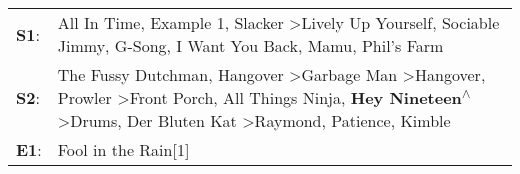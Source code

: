 \begin{supertabular}{p{0.03\textwidth}p{0.92\textwidth}}
 \textbf{S1}:  &                                                                                                                                                                                                                           All In Time\textsuperscript{}, \enspace Example 1\textsuperscript{}, \enspace Slacker\textsuperscript{} \textgreater \enspace Lively Up Yourself\textsuperscript{}, \enspace Sociable Jimmy\textsuperscript{}, \enspace G-Song\textsuperscript{}, \enspace I Want You Back\textsuperscript{}, \enspace Mamu\textsuperscript{}, \enspace Phil's Farm\textsuperscript{}  \enspace  \\
 \textbf{S2}:  &  The Fussy Dutchman\textsuperscript{}, \enspace Hangover\textsuperscript{} \textgreater \enspace Garbage Man\textsuperscript{} \textgreater \enspace Hangover\textsuperscript{}, \enspace Prowler\textsuperscript{} \textgreater \enspace Front Porch\textsuperscript{}, \enspace All Things Ninja\textsuperscript{}, \enspace \textbf{Hey Nineteen\textsuperscript{$\wedge$}} \textgreater \enspace Drums\textsuperscript{}, \enspace Der Bluten Kat\textsuperscript{} \textgreater \enspace Raymond\textsuperscript{}, \enspace Patience\textsuperscript{}, \enspace Kimble\textsuperscript{}  \enspace  \\
 \textbf{E1}:  &                                                                                                                                                                                                                                                                                                                                                                                                                                                                                                                                                           Fool in the Rain[1]\textsuperscript{}  \enspace  \\
\end{supertabular}
